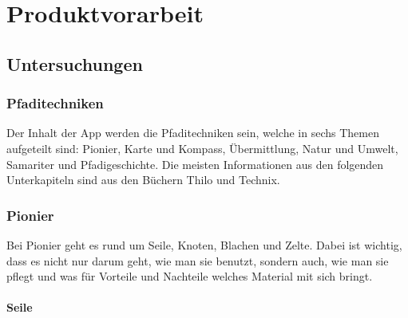 \chapter{Produktvorarbeit}
\section{Untersuchungen}
\subsection{Pfaditechniken}

Der Inhalt der App werden die Pfaditechniken sein, welche in sechs Themen aufgeteilt sind: Pionier, Karte und Kompass, Übermittlung, Natur und Umwelt, Samariter und Pfadigeschichte. Die meisten Informationen aus den folgenden Unterkapiteln sind aus den Büchern Thilo\cite{noauthor_thilo_2014} und Technix\cite{muller_technix_2007}.

\subsection*{Pionier}

Bei Pionier geht es rund um Seile, Knoten, Blachen und Zelte. Dabei ist wichtig, dass es nicht nur darum geht, wie man sie benutzt, sondern auch, wie man sie pflegt und was für Vorteile und Nachteile welches Material mit sich bringt.

\subsubsection*{Seile}

